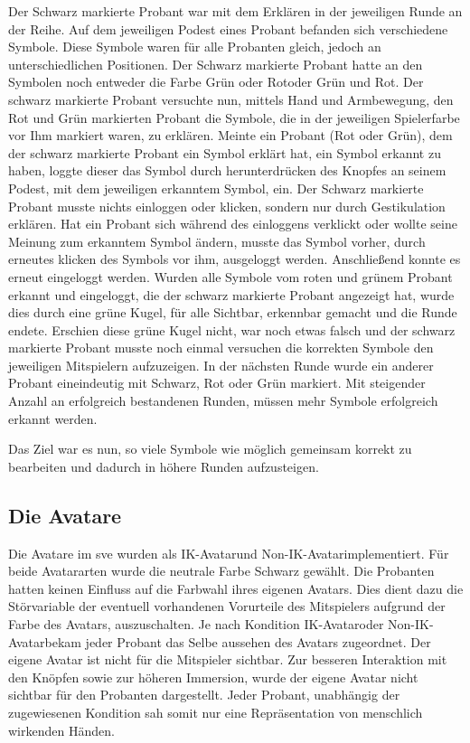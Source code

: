 \documentclass[a4paper,11pt]{article}%
\renewcommand{\\}{\vspace*{0.5\baselineskip} \newline}
\begin{document}
Der Schwarz markierte Probant war mit dem Erklären in der jeweiligen Runde an der Reihe.
Auf dem jeweiligen Podest eines Probant befanden sich verschiedene Symbole. Diese Symbole waren für alle Probanten gleich, jedoch an unterschiedlichen Positionen. Der Schwarz markierte Probant hatte an den Symbolen noch entweder die Farbe \flqq Grün oder Rot\frqq oder \flqq Grün und Rot\frqq.
Der schwarz markierte Probant versuchte nun, mittels Hand und Armbewegung, den Rot und Grün markierten Probant die Symbole, die in der jeweiligen Spielerfarbe vor Ihm markiert waren, zu erklären.
Meinte ein Probant (Rot oder Grün), dem der schwarz markierte Probant ein Symbol erklärt hat, ein Symbol erkannt zu haben, loggte dieser das Symbol durch herunterdrücken des Knopfes an seinem Podest, mit dem jeweiligen erkanntem Symbol, ein. Der Schwarz markierte Probant musste nichts einloggen oder klicken, sondern nur durch Gestikulation erklären.
Hat ein Probant sich während des einloggens verklickt oder wollte seine Meinung zum erkanntem Symbol ändern, musste das Symbol vorher, durch erneutes klicken des Symbols vor ihm, ausgeloggt werden. Anschließend konnte es erneut eingeloggt werden.
Wurden alle Symbole vom roten und grünem Probant erkannt und eingeloggt, die der schwarz markierte Probant angezeigt hat, wurde dies durch eine grüne Kugel, für alle Sichtbar, erkennbar gemacht und die Runde endete. Erschien diese grüne Kugel nicht, war noch etwas falsch und der schwarz markierte Probant musste noch einmal versuchen die korrekten Symbole den jeweiligen Mitspielern aufzuzeigen.
In der nächsten Runde wurde ein anderer Probant eineindeutig mit Schwarz, Rot oder Grün markiert.
Mit steigender Anzahl an erfolgreich bestandenen Runden, müssen mehr Symbole erfolgreich erkannt werden.

Das Ziel war es nun, so viele Symbole wie möglich gemeinsam korrekt zu bearbeiten und dadurch in höhere Runden aufzusteigen.

	\subsection{Die Avatare}
Die Avatare im \ac{sve} wurden als \flqq IK-Avatar\frqq und \flqq Non-IK-Avatar\frqq implementiert.
Für beide Avatararten wurde die neutrale Farbe Schwarz gewählt. Die Probanten hatten keinen Einfluss auf die Farbwahl ihres eigenen Avatars. Dies dient dazu die Störvariable der eventuell vorhandenen Vorurteile des Mitspielers aufgrund der Farbe des Avatars, auszuschalten. Je nach Kondition \flqq IK-Avatar\frqq oder \flqq Non-IK-Avatar\frqq bekam jeder Probant das Selbe aussehen des Avatars zugeordnet. Der eigene Avatar ist nicht für die Mitspieler sichtbar. Zur besseren Interaktion mit den Knöpfen sowie zur höheren Immersion, wurde der eigene Avatar nicht sichtbar für den Probanten dargestellt. Jeder Probant, unabhängig der zugewiesenen Kondition sah somit nur eine Repräsentation von menschlich wirkenden Händen.
\end{document}
